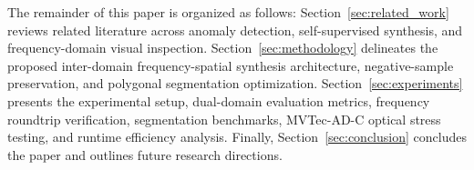 The remainder of this paper is organized as follows: Section~\ref{sec:related_work} reviews related literature across anomaly detection, self-supervised synthesis, and frequency-domain visual inspection. Section~\ref{sec:methodology} delineates the proposed inter-domain frequency-spatial synthesis architecture, negative-sample preservation, and polygonal segmentation optimization. Section~\ref{sec:experiments} presents the experimental setup, dual-domain evaluation metrics, frequency roundtrip verification, segmentation benchmarks, MVTec-AD-C optical stress testing, and runtime efficiency analysis. Finally, Section~\ref{sec:conclusion} concludes the paper and outlines future research directions.